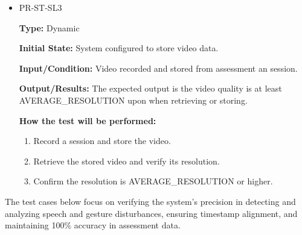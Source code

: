 \documentclass[12pt, titlepage]{article}
\begin{document}
\begin{itemize}
  \item PR-ST-SL3
  \begin{mdframed}[linewidth=0.5mm]
      \textbf{Type:} Dynamic \par
      \textbf{Initial State:} System configured to store video data. \par
      \textbf{Input/Condition:} Video recorded and stored from assessment an session. \par
      \textbf{Output/Results:} The expected output is the video quality is at least \\AVERAGE\_RESOLUTION upon when retrieving or storing. \par
      \textbf{How the test will be performed:}
      \begin{enumerate}[noitemsep]
        \item Record a session and store the video.
        \item Retrieve the stored video and verify its resolution.
        \item Confirm the resolution is AVERAGE\_RESOLUTION or higher.
      \end{enumerate}
  \end{mdframed}
\end{itemize}

\hspace{2em}The test cases below focus on verifying the system's precision in detecting and 
analyzing speech and gesture disturbances, ensuring timestamp alignment, and maintaining 
100\% accuracy in assessment data. 
\end{document}
